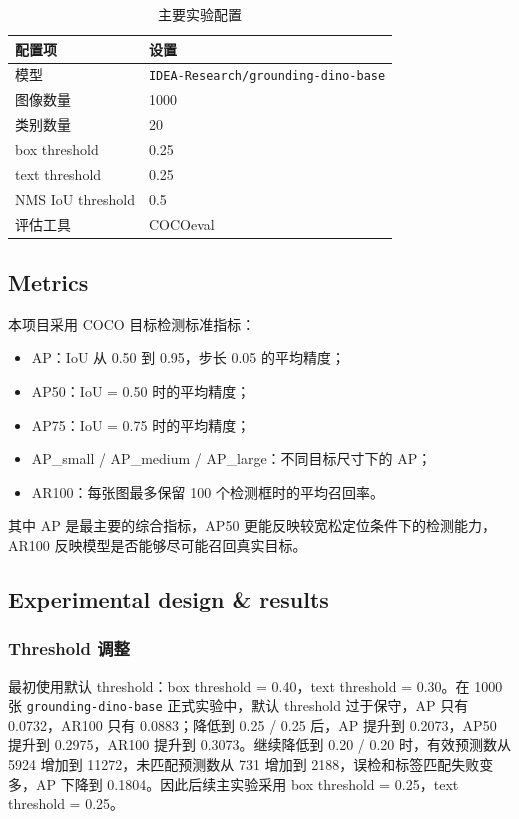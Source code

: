 \documentclass[UTF8,a4paper,11pt]{ctexart}
\begin{document}
\begin{table}[H]
\centering
\caption{主要实验配置}
\begin{tabular}{ll}
\toprule
配置项 & 设置 \\
\midrule
模型 & \texttt{IDEA-Research/grounding-dino-base} \\
图像数量 & 1000 \\
类别数量 & 20 \\
box threshold & 0.25 \\
text threshold & 0.25 \\
NMS IoU threshold & 0.5 \\
评估工具 & COCOeval \\
\bottomrule
\end{tabular}
\end{table}

\subsection{Metrics}

本项目采用 COCO 目标检测标准指标：

\begin{itemize}
  \item AP：IoU 从 0.50 到 0.95，步长 0.05 的平均精度；
  \item AP50：IoU = 0.50 时的平均精度；
  \item AP75：IoU = 0.75 时的平均精度；
  \item AP\_small / AP\_medium / AP\_large：不同目标尺寸下的 AP；
  \item AR100：每张图最多保留 100 个检测框时的平均召回率。
\end{itemize}

其中 AP 是最主要的综合指标，AP50 更能反映较宽松定位条件下的检测能力，AR100 反映模型是否能够尽可能召回真实目标。

\subsection{Experimental design \& results}

\subsubsection{Threshold 调整}

最初使用默认 threshold：box threshold = 0.40，text threshold = 0.30。在 1000 张 \texttt{grounding-dino-base} 正式实验中，默认 threshold 过于保守，AP 只有 0.0732，AR100 只有 0.0883；降低到 0.25 / 0.25 后，AP 提升到 0.2073，AP50 提升到 0.2975，AR100 提升到 0.3073。继续降低到 0.20 / 0.20 时，有效预测数从 5924 增加到 11272，未匹配预测数从 731 增加到 2188，误检和标签匹配失败变多，AP 下降到 0.1804。因此后续主实验采用 box threshold = 0.25，text threshold = 0.25。
\end{document}
